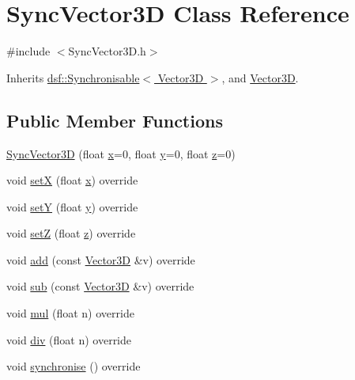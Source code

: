 \hypertarget{class_sync_vector3_d}{}\section{Sync\+Vector3\+D Class Reference}
\label{class_sync_vector3_d}


{\ttfamily \#include $<$Sync\+Vector3\+D.\+h$>$}



Inherits \hyperlink{classdsf_1_1_synchronisable}{dsf\+::\+Synchronisable$<$ Vector3\+D $>$}, and \hyperlink{class_vector3_d}{Vector3\+D}.

\subsection*{Public Member Functions}
\begin{DoxyCompactItemize}
\item 
\hyperlink{class_sync_vector3_d_a58df77cc374692447265c2a6356635ba}{Sync\+Vector3\+D} (float \hyperlink{class_vector3_d_aca5d15bdb846448e3cb73b072783f329}{x}=0, float \hyperlink{class_vector3_d_a9b6d194fcf526d7d4f9e902421285e94}{y}=0, float \hyperlink{class_vector3_d_af9728f1eba23b9ee091755346214f391}{z}=0)
\item 
void \hyperlink{class_sync_vector3_d_a281c1fdd14cf470374f97c03e80b9051}{set\+X} (float \hyperlink{class_vector3_d_aca5d15bdb846448e3cb73b072783f329}{x}) override
\item 
void \hyperlink{class_sync_vector3_d_a5d3dc3a35ff906da6e26e774c49efe98}{set\+Y} (float \hyperlink{class_vector3_d_a9b6d194fcf526d7d4f9e902421285e94}{y}) override
\item 
void \hyperlink{class_sync_vector3_d_ab46ef5a61256a8c8eeef7028efc4d418}{set\+Z} (float \hyperlink{class_vector3_d_af9728f1eba23b9ee091755346214f391}{z}) override
\item 
void \hyperlink{class_sync_vector3_d_a15fde3ee61d3c112b5badeb59a9576c4}{add} (const \hyperlink{class_vector3_d}{Vector3\+D} \&v) override
\item 
void \hyperlink{class_sync_vector3_d_aa6eef5af29a37eade701c8ea8183ab75}{sub} (const \hyperlink{class_vector3_d}{Vector3\+D} \&v) override
\item 
void \hyperlink{class_sync_vector3_d_ad6f04d38d38c227e4ae5acc551683a34}{mul} (float n) override
\item 
void \hyperlink{class_sync_vector3_d_a0aec0712353e70426391d74b84b10355}{div} (float n) override
\item 
void \hyperlink{class_sync_vector3_d_a99be7456cf1a444ce9ca3d144772f6ff}{synchronise} () override
\end{DoxyCompactItemize}
